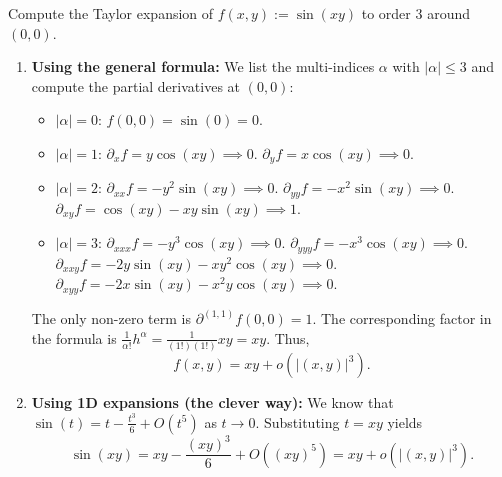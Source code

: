 \begin{example}
\label{ex:taylor_expansion_sin_xy}
Compute the Taylor expansion of $f(x,y) := \sin(xy)$ to order $3$ around $(0,0)$.
\begin{enumerate}[label=\textbf{(\alph*)}]
  \item \textbf{Using the general formula:}
    We list the multi-indices $\alpha$ with $|\alpha| \leq 3$ and compute the partial derivatives at $(0,0)$:
    \begin{itemize}
      \item $|\alpha|=0$: $f(0,0) = \sin(0) = 0$.
      \item $|\alpha|=1$: $\partial_x f = y\cos(xy) \implies 0$. $\partial_y f = x\cos(xy) \implies 0$.
      \item $|\alpha|=2$: $\partial_{xx} f = -y^2\sin(xy) \implies 0$. $\partial_{yy} f = -x^2\sin(xy) \implies 0$. $\partial_{xy} f = \cos(xy) - xy\sin(xy) \implies 1$.
      \item $|\alpha|=3$: $\partial_{xxx} f = -y^3\cos(xy) \implies 0$. $\partial_{yyy} f = -x^3\cos(xy) \implies 0$. $\partial_{xxy} f = -2y\sin(xy) - xy^2\cos(xy) \implies 0$. $\partial_{xyy} f = -2x\sin(xy) - x^2y\cos(xy) \implies 0$.
    \end{itemize}
    The only non-zero term is $\partial^{(1,1)} f(0,0) = 1$. The corresponding factor in the formula is $\frac{1}{\alpha!}h^\alpha = \frac{1}{(1!)(1!)}xy = xy$. Thus,
    \[f(x,y) = xy + o(|(x,y)|^3).\]
  \item \textbf{Using 1D expansions (the clever way):}
    We know that $\sin(t) = t - \frac{t^3}{6} + O(t^5)$ as $t \to 0$. Substituting $t = xy$ yields
    \[\sin(xy) = xy - \frac{(xy)^3}{6} + O((xy)^5) = xy + o(|(x,y)|^3).\]
\end{enumerate}
\end{example}

